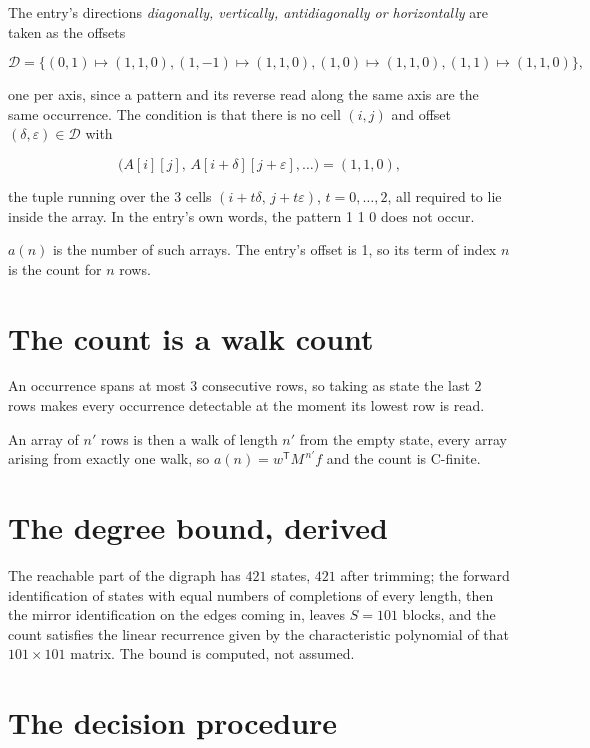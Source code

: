 \documentclass[11pt]{article}
\theoremstyle{definition}
\begin{document}
The entry's directions {\itshape diagonally, vertically, antidiagonally or horizontally} are taken as the offsets

\[\mathcal{D} = \{(0,1)\mapsto(1,1,0), (1,-1)\mapsto(1,1,0), (1,0)\mapsto(1,1,0), (1,1)\mapsto(1,1,0)\},\]

one per axis, since a pattern and its reverse read along the same axis are the same occurrence. The condition is that there is no cell $(i,j)$ and offset $(\delta,\varepsilon)\in\mathcal{D}$ with

\[\bigl(A[i][j],\,A[i{+}\delta][j{+}\varepsilon],\dots\bigr) = (1, 1, 0),\]

the tuple running over the $3$ cells $(i+t\delta,\,j+t\varepsilon)$, $t = 0,\dots,2$, all required to lie inside the array. In the entry's own words, the pattern 1 1 0 does not occur.

$a(n)$ is the number of such arrays. The entry's offset is 1, so its term of index $n$ is the count for $n$ rows.

\section{The count is a walk count}

An occurrence spans at most $3$ consecutive rows, so taking as state the last $2$ rows makes every occurrence detectable at the moment its lowest row is read.

An array of $n'$ rows is then a walk of length $n'$ from the empty state, every array arising from exactly one walk, so $a(n) = w^{\mathsf T}M^{\,n'}f$ and the count is C-finite.

\section{The degree bound, derived}

The reachable part of the digraph has $421$ states, $421$ after trimming; the forward identification of states with equal numbers of completions of every length, then the mirror identification on the edges coming in, leaves $S = 101$ blocks, and the count satisfies the linear recurrence given by the characteristic polynomial of that $101\times101$ matrix. The bound is computed, not assumed.

\section{The decision procedure}
\end{document}
